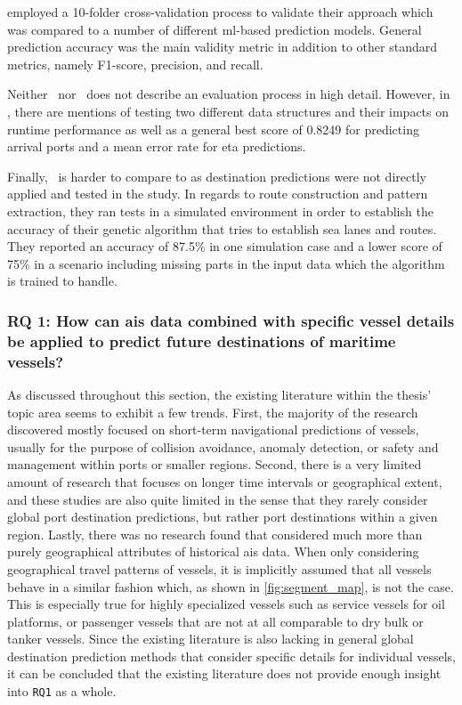\cite{Karatas2020TrajectoryData} employed a 10-folder cross-validation process to validate their approach which was compared to a number of different \acrshort{ml}-based prediction models. General prediction accuracy was the main validity metric in addition to other standard metrics, namely F1-score, precision, and recall.

Neither~\cite{Bachar2018GrandDestination} nor~\cite{Rosca2018GrandRoutes} does not describe an evaluation process in high detail. However, in \cite{Rosca2018GrandRoutes}, there are mentions of testing two different data structures and their impacts on runtime performance as well as a general best score of 0.8249 for predicting arrival ports and a mean error rate for \acrshort{eta} predictions.

Finally,~\cite{Dobrkovic2018MaritimeData} is harder to compare to as destination predictions were not directly applied and tested in the study. In regards to route construction and pattern extraction, they ran tests in a simulated environment in order to establish the accuracy of their genetic algorithm that tries to establish sea lanes and routes. They reported an accuracy of 87.5\% in one simulation case and a lower score of 75\% in a scenario including missing parts in the input data which the algorithm is trained to handle.

\subsubsection{RQ 1: How can \acrshort{ais} data combined with specific vessel details be applied to predict future destinations of maritime vessels?}

As discussed throughout this section, the existing literature within the thesis' topic area seems to exhibit a few trends. First, the majority of the research discovered mostly focused on short-term navigational predictions of vessels, usually for the purpose of collision avoidance, anomaly detection, or safety and management within ports or smaller regions. Second, there is a very limited amount of research that focuses on longer time intervals or geographical extent, and these studies are also quite limited in the sense that they rarely consider global port destination predictions, but rather port destinations within a given region. Lastly, there was no research found that considered much more than purely geographical attributes of historical \acrshort{ais} data. When only considering geographical travel patterns of vessels, it is implicitly assumed that all vessels behave in a similar fashion which, as shown in \cref{fig:segment_map}, is not the case. This is especially true for highly specialized vessels such as service vessels for oil platforms, or passenger vessels that are not at all comparable to dry bulk or tanker vessels. Since the existing literature is also lacking in general global destination prediction methods that consider specific details for individual vessels, it can be concluded that the existing literature does not provide enough insight into \texttt{RQ1} as a whole.

